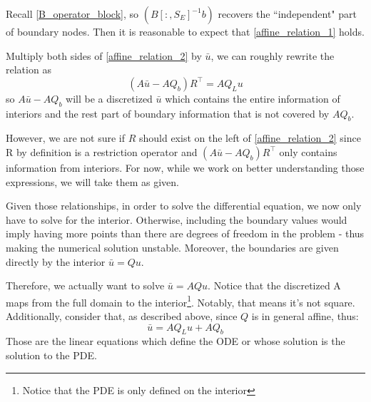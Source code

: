 \documentclass[11pt]{article}
\begin{document}
\begin{itemize}
			  Recall \cref{B_operator_block}, so $\left(B[:,S_E]^{-1} b \right)$ recovers the ``independent" part of boundary nodes. Then it is reasonable to expect that \cref{affine_relation_1} holds.

			Multiply both sides of \cref{affine_relation_2} by $\bar{u}$, we can roughly rewrite the relation as
			\begin{equation}
			(A \bar{u}-A  Q_b)  R^{\top} = A  Q_L u
			\end{equation}
			so $A \bar{u}-A   Q_b$ will be a discretized $\bar{u}$ which contains the entire information of interiors and the rest part of boundary information that is not covered by $A  Q_b$.

			However, we are not sure if $R$ should exist on the left of \cref{affine_relation_2} since R by definition is a restriction operator and $(A  \bar{u}-A  Q_b) R^{\top}$ only contains information from interiors.
			For now, while we work on better understanding those expressions, we will take them as given.


			Given those relationships, in order to solve the differential equation, we now only have to solve for the interior. Otherwise, including the boundary values would imply having more points than there are degrees of freedom in the problem - thus making the numerical solution unstable. Moreover, the boundaries are given directly by the interior $\bar{u} = Q u$.

			Therefore, we actually want to solve $\bar{u} = A Q u$. Notice that the discretized A maps from the full domain to the interior\footnote{Notice that the PDE is only defined on the interior}. Notably, that means it's not square. Additionally, consider that, as described above, since $Q$ is in general affine, thus:
			\begin{equation}
			\bar{u} = A Q_L u + A Q_b
			\end{equation}
			Those are the linear equations which define the ODE or whose solution is the solution to the PDE.
		\end{itemize}
\end{document}
